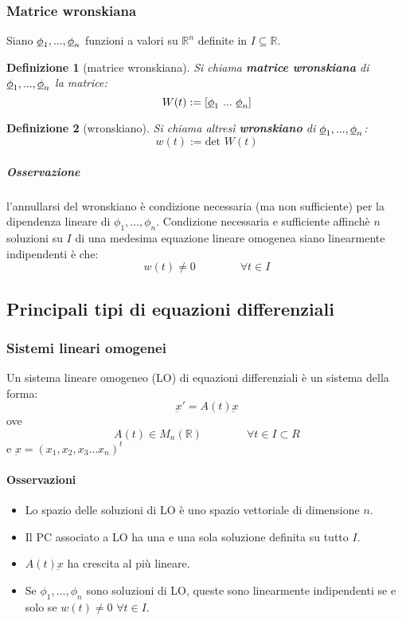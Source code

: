 \documentclass[a4paper,12pt]{article}
\newtheorem{defi}{Definizione}
\begin{document}
\subsubsection{Matrice wronskiana}
Siano $\underbar{$\phi$}_1,...,\underbar{$\phi$}_n$ funzioni a valori su $\mathbb{R}^n$ definite in $I\subseteq \mathbb{R}$.
\begin{defi}[matrice wronskiana]
Si chiama \textbf{matrice wronskiana} di $\underbar{$\phi$}_1,...,\underbar{$\phi$}_n$ la matrice:
$$W(t):=[\underbar{$\phi$}_1\ ...\ \underbar{$\phi$}_n]$$
\end{defi}
\begin{defi}[wronskiano]
Si chiama altresì \textbf{wronskiano} di $\underbar{$\phi$}_1,...,\underbar{$\phi$}_n$:
$$w(t):=\text{det } W(t)$$
\end{defi}

\subparagraph*{Osservazione} l'annullarsi del wronskiano è condizione necessaria (ma non sufficiente) per la dipendenza lineare di $\phi_1,...,\phi_n$. 
Condizione necessaria e sufficiente affinchè $n$ soluzioni su $I$ di una medesima equazione lineare omogenea siano linearmente indipendenti è che:
$$ w(t)\neq0 \qquad\qquad \forall t \in I$$


\subsection{Principali tipi di equazioni differenziali}
\subsubsection{Sistemi lineari omogenei}
Un sistema lineare omogeneo (LO) di equazioni differenziali è un sistema della forma:
$$\underbar{x}' = A(t)\underbar{x}$$ 
ove $$A(t)\in M_n(\mathbb{R})\qquad \qquad \forall t\in I\subset R$$ e $\underbar{x} = (x_1,x_2,x_3 \dots x_n)^t$
\paragraph{Osservazioni}
\begin{itemize}
 \item Lo spazio delle soluzioni di LO è uno spazio vettoriale di dimensione $n$.
 \item Il PC associato a LO ha una e una sola soluzione definita su tutto $I$.
 \item $A(t)\underbar{x}$ ha crescita al più lineare.
 \item Se $\phi_1,...,\phi_n$ sono soluzioni di LO, queste sono linearmente indipendenti se e solo se $w(t)\neq0$ $\forall t \in I$.
\end{itemize}
\end{document}
